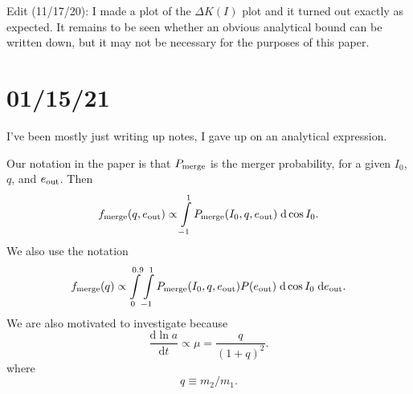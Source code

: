 \documentclass[11pt,
        usenames, %
        dvipsnames %
    ]{article}
\newcommand*{\rd}[2]{\frac{\mathrm{d}#1}{\mathrm{d}#2}}
\begin{document}
Edit (11/17/20): I made a plot of the $\Delta K(I)$ plot and it turned out
exactly as expected. It remains to be seen whether an obvious analytical bound
can be written down, but it may not be necessary for the purposes of this paper.

\section{01/15/21}

I've been mostly just writing up notes, I gave up on an analytical expression.

Our notation in the paper is that $P_{\rm merge}$ is the merger probability, for
a given $I_0$, $q$, and $e_{\rm out}$. Then
\begin{equation}
    f_{\rm merge}(q, e_{\rm out}) \propto
        \int\limits_{-1}^1 P_{\rm merge}(I_0, q, e_{\rm out})\;\mathrm{d}\cos
        I_0.
\end{equation}
We also use the notation
\begin{equation}
    f_{\rm merge}(q) \propto \int\limits_0^{0.9}\int\limits_{-1}^1 P_{\rm merge}(I_0,
        q, e_{\rm out}) P(e_{\rm out}) \;\mathrm{d}\cos I_0\;\mathrm{d}e_{\rm
        out}.
\end{equation}
We are also motivated to investigate because
\begin{equation}
    \rd{\ln a}{t} \propto \mu = \frac{q}{(1 + q)^2}.
\end{equation}
where
\begin{equation}
    q \equiv m_2 / m_1.
\end{equation}
\end{document}

